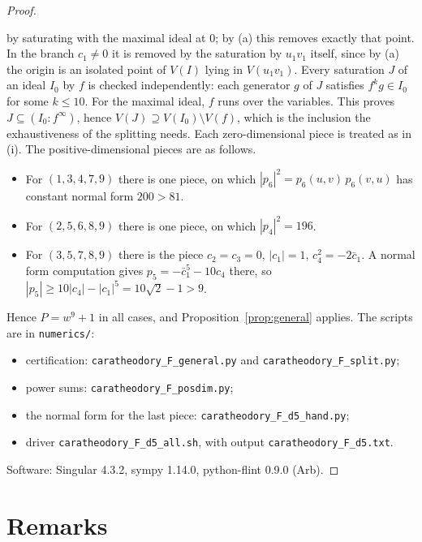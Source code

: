 \documentclass[11pt]{amsart}
\theoremstyle{remark}
\begin{document}
\begin{proof}
\begin{itemize}
by saturating with the maximal ideal at $0$; by (a) this removes exactly that point. In the branch $c_1\ne0$ it is removed by the saturation by $u_1v_1$
itself, since by (a) the origin is an isolated point of $V(I)$ lying in $V(u_1v_1)$. Every saturation $J$ of an ideal $I_0$ by $f$ is checked
independently: each generator $g$ of $J$ satisfies $f^kg\in I_0$ for some $k\le10$. For the maximal ideal, $f$ runs over the variables. This proves
$J\subseteq(I_0:f^\infty)$, hence $V(J)\supseteq V(I_0)\setminus V(f)$, which is the inclusion the exhaustiveness of the splitting needs. Each
zero-dimensional piece is treated as in (i). The positive-dimensional pieces are as follows.
\begin{itemize}
\item For $(1,3,4,7,9)$ there is one piece, on which $|p_6|^2=p_6(u,v)\,p_6(v,u)$ has constant normal form $200>81$.
\item For $(2,5,6,8,9)$ there is one piece, on which $|p_4|^2=196$.
\item For $(3,5,7,8,9)$ there is the piece $c_2=c_3=0$, $|c_1|=1$, $c_4^2=-2\bar c_1$. A normal form computation gives $p_5=-\bar c_1^5-10c_4$ there, so
$|p_5|\ge10|c_4|-|c_1|^5=10\sqrt2-1>9$.
\end{itemize}
\end{itemize}
Hence $P=w^9+1$ in all cases, and Proposition~\ref{prop:general} applies. The scripts are in \texttt{numerics/}:
\begin{itemize}
\item certification: \texttt{caratheodory\_F\_general.py} and \texttt{caratheodory\_F\_split.py};
\item power sums: \texttt{caratheodory\_F\_posdim.py};
\item the normal form for the last piece: \texttt{caratheodory\_F\_d5\_hand.py};
\item driver \texttt{caratheodory\_F\_d5\_all.sh}, with output \texttt{caratheodory\_F\_d5.txt}.
\end{itemize}
Software: Singular 4.3.2, sympy 1.14.0, python-flint 0.9.0 (Arb).
\end{proof}

\section{Remarks}
\end{document}
